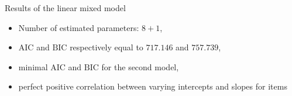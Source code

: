 \documentclass[unknownkeysallowed]{beamer}
\newcommand*{\AIC}{\mathrm{AIC}}
\newcommand*{\BIC}{\mathrm{BIC}}
\begin{document}

\begin{frame}{Results of the linear mixed model}
\begin{itemize}
    \item Number of estimated parameters: $8+1$,
    \item $\AIC$ and $\BIC$ respectively equal to $717.146$ and $757.739$,
    \item minimal $\AIC$ and $\BIC$ for the second model,
    \item perfect positive correlation between varying intercepts and slopes for items
\end{itemize}
\end{frame}
\end{document}
